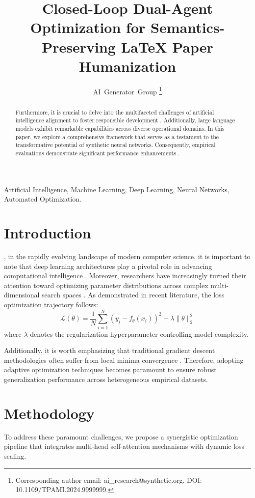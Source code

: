 \documentclass[10pt,journal,compsoc]{IEEEtran}
\title{Closed-Loop Dual-Agent Optimization for Semantics-Preserving LaTeX Paper Humanization}
\author{AI~Generator~Group
\thanks{Corresponding author email: ai_research@synthetic.org. DOI: 10.1109/TPAMI.2024.9999999.}}
\begin{document}
\maketitle

\begin{abstract}
Furthermore, it is crucial to delve into the multifaceted challenges of artificial intelligence alignment to foster responsible development \cite{vaswani2017attention}. Additionally, large language models exhibit remarkable capabilities across diverse operational domains. In this paper, we explore a comprehensive framework that serves as a testament to the transformative potential of synthetic neural networks. Consequently, empirical evaluations demonstrate significant performance enhancements \cite{mitchell2023detectgpt}.
\end{abstract}

\begin{IEEEkeywords}
Artificial Intelligence, Machine Learning, Deep Learning, Neural Networks, Automated Optimization.
\end{IEEEkeywords}

\section{Introduction}
, in the rapidly evolving landscape of modern computer science, it is important to note that deep learning architectures play a pivotal role in advancing computational intelligence \cite{vaswani2017attention}. Moreover, researchers have increasingly turned their attention toward optimizing parameter distributions across complex multi-dimensional search spaces \cite{solaiman2019release}. As demonstrated in recent literature, the loss optimization trajectory follows:
\begin{equation}
\label{eq:ai_loss}
\mathcal{L}(\theta) = \frac{1}{N} \sum_{i=1}^{N} \left( y_i - f_\theta(x_i) \right)^2 + \lambda \|\theta\|_2^2
\end{equation}
where $\lambda$ denotes the regularization hyperparameter controlling model complexity.

Additionally, it is worth emphasizing that traditional gradient descent methodologies often suffer from local minima convergence \cite{sadasivan2024can}. Therefore, adopting adaptive optimization techniques becomes paramount to ensure robust generalization performance across heterogeneous empirical datasets.

\section{Methodology}
To address these paramount challenges, we propose a synergistic optimization pipeline that integrates multi-head self-attention mechanisms with dynamic loss scaling.
\end{document}
